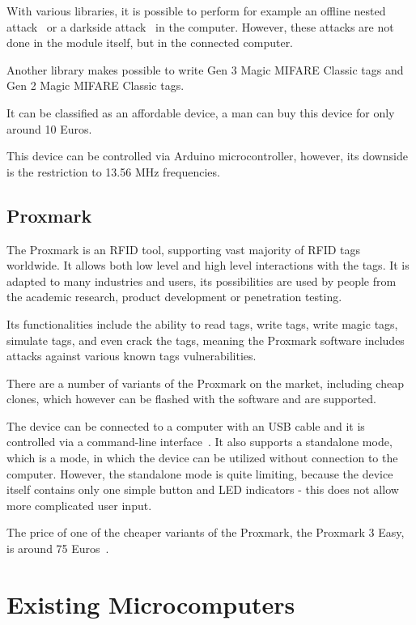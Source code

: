 With various libraries, it is possible to perform for example an offline nested attack~\cite{nestedpn532} or a darkside attack~\cite{darksidepn532} in the computer. However, these attacks are not done in the module itself, but in the connected computer.

Another library makes possible to write Gen 3 Magic MIFARE Classic tags and Gen 2 Magic MIFARE Classic tags.~\cite{clonerpn532}

It can be classified as an affordable device, a man can buy this device for only around 10 Euros.~\cite{pn532shop}

This device can be controlled via Arduino microcontroller, however, its downside is the restriction to 13.56 MHz frequencies.


\subsection{Proxmark}

The Proxmark is an RFID tool, supporting vast majority of RFID tags worldwide. It allows both low level and high level interactions with the tags. It is adapted to many industries and users, its possibilities are used by people from the academic research, product development or penetration testing.~\cite{proxmark}

Its functionalities include the ability to read tags, write tags, write magic tags, simulate tags, and even crack the tags, meaning the Proxmark software includes attacks against various known tags vulnerabilities. \cite{proxmarkwiki}

There are a number of variants of the Proxmark on the market, including cheap clones, which however can be flashed with the software and are supported.~\cite{proxmarkclones}

The device can be connected to a computer with an USB cable and it is controlled via a command-line interface~\cite{proxmarkcommands}. It also supports a standalone mode, which is a mode, in which the device can be utilized without connection to the computer. However, the standalone mode is quite limiting, because the device itself contains only one simple button and LED indicators - this does not allow more complicated user input.~\cite{proxmarkstandalone}

The price of one of the cheaper variants of the Proxmark, the Proxmark 3 Easy, is around 75 Euros~\cite{proxmarkshop}.


\section{Existing Microcomputers}

